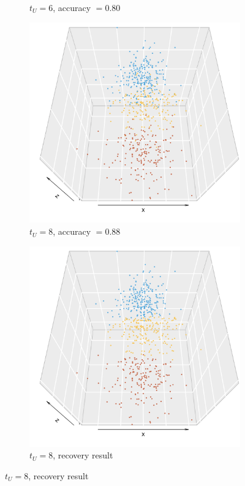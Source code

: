 \documentclass[10pt,journal,compsoc]{IEEEtran}
\numberwithin{equation}{section}
\begin{document}
\begin{figure}
\begin{subfigure}{.24\columnwidth}
\caption{$t_U = 6$, accuracy $=0.80$}
\label{12:3}
\end{subfigure}
\begin{subfigure}{.24\columnwidth}
\includegraphics[width=\columnwidth]{svd_8_d}%
\caption{$t_U = 8$, accuracy $=0.88$}
\end{subfigure}
\begin{subfigure}{.24\columnwidth}
\includegraphics[width=\columnwidth]{svd_8_kmeans_d}%
\caption{$t_U = 8$, recovery result}
\end{subfigure}


\end{figure}
\end{document}
